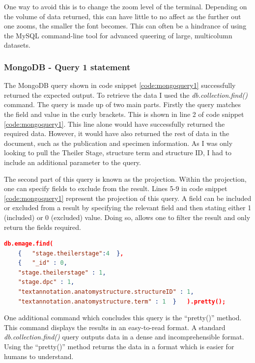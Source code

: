 One way to avoid this is to change the zoom level of the terminal. Depending on the volume of data returned, this can have little to no affect as the further out one zooms, the smaller the font becomes. This can often be a hindrance of using the MySQL command-line tool for advanced queering of large, multicolumn datasets.

\subsubsection*{MongoDB - Query 1 statement}\label{mongoquery1statement}
The MongoDB query shown in code snippet \ref{code:mongoquery1} successfully returned the expected output. To retrieve the data I used the \textit{db.collection.find()} command. The query is made up of two main parts. Firstly the query matches the field and value in the curly brackets. This is shown in line 2 of code snippet \ref{code:mongoquery1}. This line alone would have successfully returned the required data. However, it would have also returned the rest of data in the document, such as the publication and specimen information. As I was only looking to pull the Theiler Stage, structure term and structure ID, I had to include an additional parameter to the query.

The second part of this query is known as the projection. Within the projection, one can specify fields to exclude from the result. Lines 5-9 in code snippet \ref{code:mongoquery1} represent the projection of this query. A field can be included or excluded from a result by specifying the relevant field and then stating either 1 (included) or 0 (excluded) value. Doing so, allows one to filter the result and only return the fields required.

\begin{lstlisting}[language=json, caption=MongoDB query 1 statement. All structures at Theiler Stage X., label=code:mongoquery1]
db.emage.find(
	{	"stage.theilerstage":4	},
    {	"_id" : 0,
    "stage.theilerstage" : 1,
    "stage.dpc" : 1,
    "textannotation.anatomystructure.structureID" : 1,
    "textannotation.anatomystructure.term" : 1	}	).pretty();
\end{lstlisting}

One additional command which concludes this query is the ``pretty()'' method. This command displays the results in an easy-to-read format. A standard \textit{db.collection.find()} query outputs data in a dense and incomprehensible format. Using the ``pretty()'' method returns the data in a format which is easier for humans to understand.

